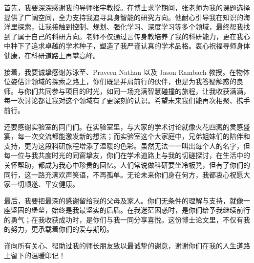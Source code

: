 \cleardoublepage
{}

首先，我要深深感谢我的导师张宇教授。在博士求学期间，张老师为我的课题选择提供了广阔空间，全力支持我追寻具身智能的研究方向。他耐心引导我在知识的海洋里探索，让我接触到控制、规划、强化学习、深度学习等多个领域，最终帮我找到了属于自己的科研方向。老师不仅通过言传身教培养了我的科研能力，更在我心中种下了追求卓越的学术种子，塑造了我严谨认真的学术品格。衷心祝福导师身体健康，在科研道路上再攀高峰。

接着，我要诚挚感谢苏泳至、Praveen Nathan 以及 Jason Rambach 教授。在物体位姿估计领域的探索之路上，你们既是并肩前行的伙伴，也是为我答疑解惑的良师。与你们共同参与项目的时光，如同一场充满智慧碰撞的旅程，让我收获满满，每一次讨论都让我对这个领域有了更深刻的认识。希望未来我们能再次相聚、携手前行。

还要感谢实验室的同门们。在实验室里，与大家的学术讨论就像火花四溅的灵感盛宴，每一次交流都能激发新的想法；而实验室这个大家庭中，兄弟姐妹们的陪伴和支持，更为这段科研旅程增添了温暖的色彩。虽然无法一一叫出每个人的名字，但每一位与我共度时光的同窗挚友，你们在学术道路上与我的切磋探讨，在生活中的关怀帮助，都成为我心中珍贵的回忆。人们常说做科研要坐冷板凳，但有了你们的同行，这一路充满欢声笑语，不再孤单。无论未来你们身在何方，我都衷心祝愿大家一切顺遂、平安健康。

最后，我要把最深的感谢留给我的父母及家人。你们无条件的理解与支持，就像一座坚固的堡垒，始终是我最坚实的后盾。在我迷茫困惑时，是你们给予我继续前行的勇气；在我收获成功时，是你们与我一同分享喜悦。这份博士论文里，不仅有我的努力，更承载着你们的爱与期盼。

谨向所有关心、帮助过我的师长朋友致以最诚挚的谢意，谢谢你们在我的人生道路上留下的温暖印记！

